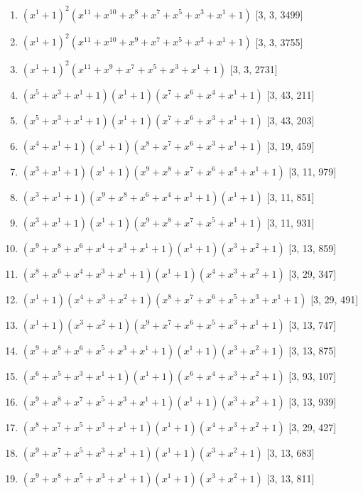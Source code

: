 \documentclass[10pt,twocolumn]{article}
\begin{document}
\begin{enumerate}
\item $(x^{1} + 1)^{2}(x^{11} + x^{10} + x^{8} + x^{7} + x^{5} + x^{3} + x^{1} + 1)$  [3, 3, 3499]
\item $(x^{1} + 1)^{2}(x^{11} + x^{10} + x^{9} + x^{7} + x^{5} + x^{3} + x^{1} + 1)$  [3, 3, 3755]
\item $(x^{1} + 1)^{2}(x^{11} + x^{9} + x^{7} + x^{5} + x^{3} + x^{1} + 1)$  [3, 3, 2731]
\item $(x^{5} + x^{3} + x^{1} + 1)(x^{1} + 1)(x^{7} + x^{6} + x^{4} + x^{1} + 1)$  [3, 43, 211]
\item $(x^{5} + x^{3} + x^{1} + 1)(x^{1} + 1)(x^{7} + x^{6} + x^{3} + x^{1} + 1)$  [3, 43, 203]
\item $(x^{4} + x^{1} + 1)(x^{1} + 1)(x^{8} + x^{7} + x^{6} + x^{3} + x^{1} + 1)$  [3, 19, 459]
\item $(x^{3} + x^{1} + 1)(x^{1} + 1)(x^{9} + x^{8} + x^{7} + x^{6} + x^{4} + x^{1} + 1)$  [3, 11, 979]
\item $(x^{3} + x^{1} + 1)(x^{9} + x^{8} + x^{6} + x^{4} + x^{1} + 1)(x^{1} + 1)$  [3, 11, 851]
\item $(x^{3} + x^{1} + 1)(x^{1} + 1)(x^{9} + x^{8} + x^{7} + x^{5} + x^{1} + 1)$  [3, 11, 931]
\item $(x^{9} + x^{8} + x^{6} + x^{4} + x^{3} + x^{1} + 1)(x^{1} + 1)(x^{3} + x^{2} + 1)$  [3, 13, 859]
\item $(x^{8} + x^{6} + x^{4} + x^{3} + x^{1} + 1)(x^{1} + 1)(x^{4} + x^{3} + x^{2} + 1)$  [3, 29, 347]
\item $(x^{1} + 1)(x^{4} + x^{3} + x^{2} + 1)(x^{8} + x^{7} + x^{6} + x^{5} + x^{3} + x^{1} + 1)$  [3, 29, 491]
\item $(x^{1} + 1)(x^{3} + x^{2} + 1)(x^{9} + x^{7} + x^{6} + x^{5} + x^{3} + x^{1} + 1)$  [3, 13, 747]
\item $(x^{9} + x^{8} + x^{6} + x^{5} + x^{3} + x^{1} + 1)(x^{1} + 1)(x^{3} + x^{2} + 1)$  [3, 13, 875]
\item $(x^{6} + x^{5} + x^{3} + x^{1} + 1)(x^{1} + 1)(x^{6} + x^{4} + x^{3} + x^{2} + 1)$  [3, 93, 107]
\item $(x^{9} + x^{8} + x^{7} + x^{5} + x^{3} + x^{1} + 1)(x^{1} + 1)(x^{3} + x^{2} + 1)$  [3, 13, 939]
\item $(x^{8} + x^{7} + x^{5} + x^{3} + x^{1} + 1)(x^{1} + 1)(x^{4} + x^{3} + x^{2} + 1)$  [3, 29, 427]
\item $(x^{9} + x^{7} + x^{5} + x^{3} + x^{1} + 1)(x^{1} + 1)(x^{3} + x^{2} + 1)$  [3, 13, 683]
\item $(x^{9} + x^{8} + x^{5} + x^{3} + x^{1} + 1)(x^{1} + 1)(x^{3} + x^{2} + 1)$  [3, 13, 811]

\end{enumerate}
\end{document}
